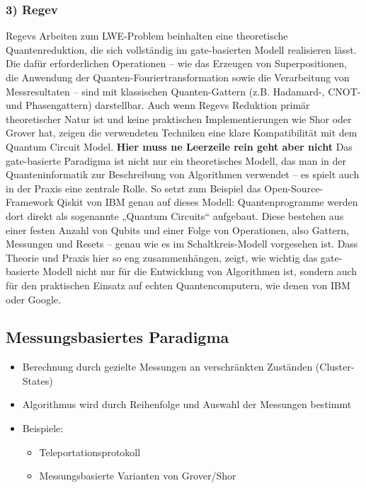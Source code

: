 \subsubsection*{3) Regev}
Regevs Arbeiten zum LWE-Problem beinhalten eine theoretische Quantenreduktion, die sich vollständig im gate-basierten Modell realisieren lässt. Die dafür erforderlichen Operationen – wie das Erzeugen von Superpositionen, die Anwendung der Quanten-Fouriertransformation sowie die Verarbeitung von Messresultaten – sind mit klassischen Quanten-Gattern (z.B. Hadamard-, CNOT- und Phasengattern) darstellbar. Auch wenn Regevs Reduktion primär theoretischer Natur ist und keine praktischen Implementierungen wie Shor oder Grover hat, zeigen die verwendeten Techniken eine klare Kompatibilität mit dem Quantum Circuit Model.
\textbf{Hier muss ne Leerzeile rein geht aber nicht}
Das gate-basierte Paradigma ist nicht nur ein theoretisches Modell, das man in der Quanteninformatik zur Beschreibung von Algorithmen verwendet – es spielt auch in der Praxis eine zentrale Rolle. So setzt zum Beispiel das Open-Source-Framework Qiskit von IBM genau auf dieses Modell: Quantenprogramme werden dort direkt als sogenannte „Quantum Circuits“ aufgebaut. Diese bestehen aus einer festen Anzahl von Qubits und einer Folge von Operationen, also Gattern, Messungen und Resets – genau wie es im Schaltkreis-Modell vorgesehen ist.
Dass Theorie und Praxis hier so eng zusammenhängen, zeigt, wie wichtig das gate-basierte Modell nicht nur für die Entwicklung von Algorithmen ist, sondern auch für den praktischen Einsatz auf echten Quantencomputern, wie denen von IBM oder Google.

\subsection{Messungsbasiertes Paradigma}
\begin{itemize}
    \item Berechnung durch gezielte Messungen an verschränkten Zuständen (Cluster-States)
    \item Algorithmus wird durch Reihenfolge und Auswahl der Messungen bestimmt
    \item Beispiele:
    \begin{itemize}
        \item Teleportationsprotokoll
        \item Messungsbasierte Varianten von Grover/Shor
    \end{itemize}
\end{itemize}

